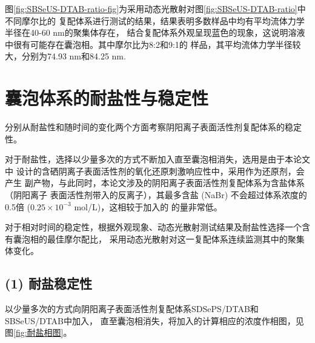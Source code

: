\documentclass[bachelor,winfonts,replaceperiod]{jnuthesis}
\begin{document}
    图\ref{fig:SBSeUS-DTAB-ratio-fig}为采用动态光散射对图\ref{fig:SBSeUS-DTAB-ratio}中不同摩尔比的
    复配体系进行测试的结果，结果表明多数样品中均有平均流体力学半径在40-60 nm的聚集体存在，
    结合复配体系外观呈现蓝色的现象，这说明溶液中很有可能存在囊泡相。其中摩尔比为8:2和9:1的
    样品，其平均流体力学半径较大，分别为74.93 nm和84.25 nm.
    
    \section{囊泡体系的耐盐性与稳定性}
    分别从耐盐性和随时间的变化两个方面考察阴阳离子表面活性剂复配体系的稳定性。
    
    对于耐盐性，选择以少量多次的方式不断加入直至囊泡相消失，选用是由于本论文中
    设计的含硒阴离子表面活性剂的氧化还原刺激响应性中，采用作为还原剂，会产生
    副产物，与此同时，本论文涉及的阴阳离子表面活性剂复配体系为含盐体系（阴阳离子
    表面活性剂带入的反离子），其最多含盐 (NaBr) 不会超过体系浓度的0.5倍 ($0.25 \times 10^{-3}$ mol/L)，这相较于加入的
    的量非常低。
    
    对于相对时间的稳定性，根据外观现象、动态光散射测试结果及耐盐性选择一个含有囊泡相的最佳摩尔配比，
    采用动态光散射对这一复配体系连续监测其中的聚集体变化。
    
    \subsection*{(1) 耐盐稳定性}
    以少量多次的方式向阴阳离子表面活性剂复配体系SDSePS/DTAB和SBSeUS/DTAB中加入，
    直至囊泡相消失，将加入的计算相应的浓度作相图，见图\ref{fig:耐盐相图}。
\end{document}
